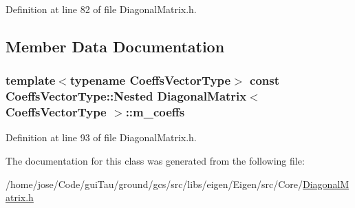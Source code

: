 Definition at line 82 of file Diagonal\-Matrix.\-h.



\subsection{Member Data Documentation}
\hypertarget{class_diagonal_matrix_a07b32cceb0f016ecc3a0dbf6dcbc4132}{
\subsubsection[{m\-\_\-coeffs}]{\setlength{\rightskip}{0pt plus 5cm}template$<$typename Coeffs\-Vector\-Type$>$ const Coeffs\-Vector\-Type\-::\-Nested {\bf Diagonal\-Matrix}$<$ Coeffs\-Vector\-Type $>$\-::m\-\_\-coeffs\hspace{0.3cm}{\ttfamily [protected]}}}\label{class_diagonal_matrix_a07b32cceb0f016ecc3a0dbf6dcbc4132}


Definition at line 93 of file Diagonal\-Matrix.\-h.



The documentation for this class was generated from the following file\-:\begin{DoxyCompactItemize}
\item 
/home/jose/\-Code/gui\-Tau/ground/gcs/src/libs/eigen/\-Eigen/src/\-Core/\hyperlink{_diagonal_matrix_8h}{Diagonal\-Matrix.\-h}\end{DoxyCompactItemize}
